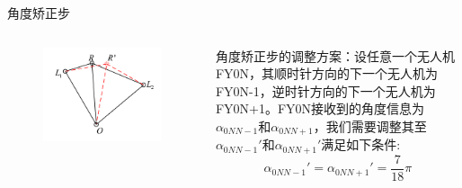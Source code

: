 \documentclass[aspectratio=169]{beamer}
\begin{document}
\begin{frame}{角度矫正步}
    \begin{columns}
        \begin{figure}[!ht]
            \centering
            \includegraphics[width = \textwidth]{图片/角度矫正步.pdf}
        \end{figure}

        角度矫正步的调整方案：设任意一个无人机FY0N，其顺时针方向的下一个无人机为FY0N-1，逆时针方向的下一个无人机为FY0N+1。FY0N接收到的角度信息为$\alpha_{0NN-1}$和$\alpha_{0NN+1}$，我们需要调整其至$\alpha_{0NN-1}'$和$\alpha_{0NN+1}'$满足如下条件:
        \begin{equation}
            \alpha_{0NN-1}' = \alpha_{0NN+1}' = \frac{7}{18}\pi
        \end{equation}
    \end{columns}
\end{frame}
\end{document}
